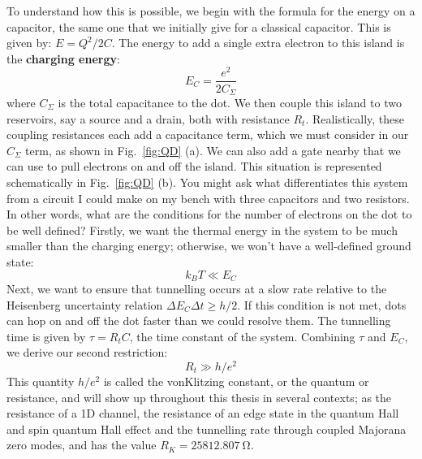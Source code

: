 To understand how this is possible, we begin with the formula for the energy on a capacitor, the same one that
we initially give for a classical capacitor. This is given by: $E = Q^2/2C$. The energy to add a single extra electron
to this island is the \textbf{charging energy}:
\begin{equation}
  E_C = \frac{e^2}{2 C_{\Sigma}}
\end{equation}
where $C_\Sigma$ is the total capacitance to the dot. We then couple this island to two reservoirs, say a source
and a drain, both with resistance $R_t$. Realistically, these coupling resistances each add a capacitance term, which
we must consider in our $C_\Sigma$ term, as shown in Fig.~\ref{fig:QD} (a). We can also add a gate nearby that we can use to pull electrons on and off
the island. This situation is represented schematically in Fig.~\ref{fig:QD} (b). You might ask what differentiates
this system from a circuit I could make on my bench with three capacitors and two resistors. In other words, what are
the conditions for the number of electrons on the dot to be well defined? Firstly, we want the thermal energy
in the system to be much smaller than the charging energy; otherwise, we won't have a well-defined ground state:
\begin{equation}
  k_B T \ll E_C
\end{equation}
Next, we want to ensure that tunnelling occurs at a slow rate relative to the Heisenberg uncertainty relation
$\Delta E_C \Delta t \geq h/2$. If this condition is not met, dots can hop on and off the dot faster than we could resolve them.
The tunnelling time is given by $\tau = R_t C$, the time constant of the system. Combining $\tau$ and $E_C$,
we derive our second restriction:
\begin{equation}
  R_t \gg h/e^2
\end{equation}
This quantity $h/e^2$ is called the vonKlitzing constant, or the quantum or resistance, and will show up
throughout this thesis in several contexts; as the resistance of a 1D channel, the resistance of an edge
state in the quantum Hall and spin quantum Hall effect and the tunnelling rate through coupled Majorana zero modes,
and has the value $R_K = \SI{25812.807}{\ohm}$.

